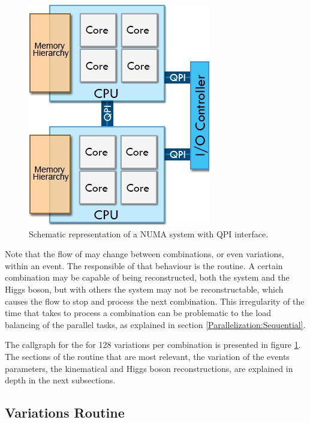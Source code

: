 \begin{figure}[!htp]
	\begin{center}
		\includegraphics[scale=0.5]{../../common/img/numa_qpi.png}
		\caption{Schematic representation of a NUMA system with QPI interface.}
		\label{fig:CallgraphKinFit}
	\end{center}
\end{figure}

Note that the flow of \ttDilepKinFit may change between combinations, or even variations, within an event. The responsible of that behaviour is the \dilep routine. A certain combination may be capable of being reconstructed, both the \ttbar system and the Higgs boson, but with others the \ttbar system may not be reconstructable, which causes the \ttDilepKinFit flow to stop and process the next combination. This irregularity of the time that takes to process a combination can be problematic to the load balancing of the parallel tasks, as explained in section \ref{Parallelization:Sequential}.

The callgraph for the \ttDilepKinFit for 128 variations per combination is presented in figure \ref{fig:CallgraphKinFit}. The sections of the routine that are most relevant, the variation of the events parameters, the kinematical and Higgs boson reconstructions, are explained in depth in the next subsections.

\subsection{Variations Routine}
\label{Application:Variations}

